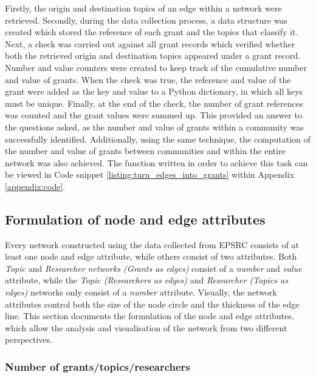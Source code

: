 Firstly, the origin and destination topics of an edge within a network were retrieved. Secondly, during the data collection process, a data structure was created which stored the reference of each grant and the topics that classify it. Next, a check was carried out against all grant records which verified whether both the retrieved origin and destination topics appeared under a grant record. Number and value counters were created to keep track of the cumulative number and value of grants. When the check was true, the reference and value of the grant were added as the key and value to a Python dictionary, in which all keys must be unique. Finally, at the end of the check, the number of grant references was counted and the grant values were summed up. This provided an answer to the questions asked, as the number and value of grants within a community was successfully identified. Additionally, using the same technique, the computation of the number and value of grants between communities and within the entire network was also achieved. The function written in order to achieve this task can be viewed in Code snippet \ref{listing:turn_edges_into_grants} within Appendix \ref{appendix:code}.

\subsection{Formulation of node and edge attributes}

Every network constructed using the data collected from EPSRC consists of at least one node and edge attribute, while others consist of two attributes. Both \textit{Topic} and \textit{Researcher networks (Grants as edges)} consist of a \textit{number} and \textit{value} attribute, while the \textit{Topic (Researchers as edges)} and \textit{Researcher (Topics as edges)} networks only consist of a \textit{number} attribute. Visually, the network attributes control both the size of the node circle and the thickness of the edge line. This section documents the formulation of the node and edge attributes, which allow the analysis and visualisation of the network from two different perspectives.

\subsubsection{Number of grants/topics/researchers}

